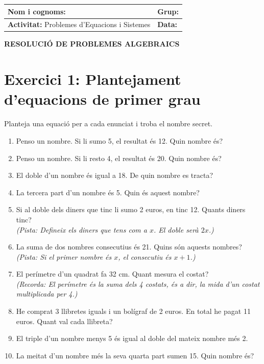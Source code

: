 \documentclass[12pt,a4paper]{article}
\begin{document}
\begingroup
\renewcommand{\arraystretch}{2.2}
\begin{tabularx}{\textwidth}{|X|p{4cm}|}
    \hline
    \textbf{Nom i cognoms:} & \textbf{Grup:} \\ \hline
    \textbf{Activitat:} Problemes d'Equacions i Sistemes & \textbf{Data:} \\ \hline
\end{tabularx}
\endgroup

\vspace{0.8cm}

\begin{center}
    {\Large \textbf{RESOLUCIÓ DE PROBLEMES ALGEBRAICS}}
\end{center}

\vspace{0.5cm}

\section*{Exercici 1: Plantejament d'equacions de primer grau}
Planteja una equació per a cada enunciat i troba el nombre secret.

\begin{enumerate}[label=\textbf{\arabic*.}]
    \item Penso un nombre. Si li sumo 5, el resultat és 12. Quin nombre és?
    \item Penso un nombre. Si li resto 4, el resultat és 20. Quin nombre és?
    \item El doble d'un nombre és igual a 18. De quin nombre es tracta?
    \item La tercera part d'un nombre és 5. Quin és aquest nombre?
    
    \item Si al doble dels diners que tinc li sumo 2 euros, en tinc 12. Quants diners tinc? \\
    {\small \textit{(Pista: Defineix els diners que tens com a $x$. El doble serà $2x$.)}}
    
    \item La suma de dos nombres consecutius és 21. Quins són aquests nombres? \\
    {\small \textit{(Pista: Si el primer nombre és $x$, el consecutiu és $x+1$.)}}
    
    \item El perímetre d'un quadrat fa 32 cm. Quant mesura el costat? \\
    {\small \textit{(Recorda: El perímetre és la suma dels 4 costats, és a dir, la mida d'un costat multiplicada per 4.)}}
    
    \item He comprat 3 llibretes iguals i un bolígraf de 2 euros. En total he pagat 11 euros. Quant val cada llibreta?
    \item El triple d'un nombre menys 5 és igual al doble del mateix nombre més 2.
    \item La meitat d'un nombre més la seva quarta part sumen 15. Quin nombre és?
\end{enumerate}
\end{document}
